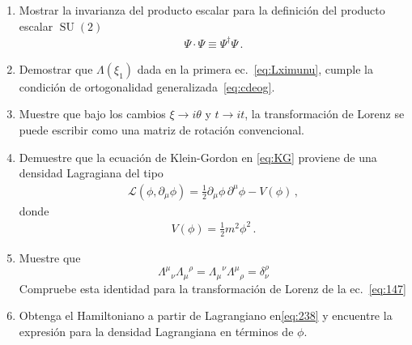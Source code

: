 \begin{enumerate}
\item  Mostrar la invarianza del producto escalar para la definición del producto escalar $\operatorname{SU}(2)$
\begin{align}
   \Psi\cdot \Psi \equiv \Psi^{\dagger}\Psi\,.
\end{align}

\item Demostrar que $\Lambda(\xi_1)$ dada en la primera ec.~\eqref{eq:Lximunu},  cumple la condición de ortogonalidad generalizada~\eqref{eq:cdeog}.

\item Muestre que bajo los cambios $\xi\to i\theta$ y $t\to it$, la transformación de Lorenz se puede escribir como una matriz de rotación convencional.

\item  Demuestre que la ecuación de Klein-Gordon en \eqref{eq:KG} proviene de una densidad Lagragiana del tipo
\begin{align}
  \mathcal{L}(\phi,\partial_{\mu} \phi)=  \frac{1}{2}{\partial_\mu\phi}\,{\partial^\mu\phi}-V(\phi)\,,
\end{align}
donde
\begin{align}
  V(\phi)=\frac{1}{2}m^2 \phi^2\,.
\end{align}

  
  
\item Muestre que
  \begin{equation*}
    {\Lambda^{\mu}}_{\nu}{\Lambda_\mu}^{\rho}={\Lambda_{\mu}}^{\nu}{\Lambda^{\mu}}_{\rho}=\delta^\rho_\nu
  \end{equation*}
Compruebe esta identidad para la transformación de Lorenz de la ec.~\eqref{eq:147}
\label{item:pch2.1} %

  
\item Obtenga el Hamiltoniano a partir de Lagrangiano en\eqref{eq:238} y encuentre la expresión para la densidad Lagrangiana en términos de $\phi$.
\label{item:pch1.0} %






\end{enumerate}
